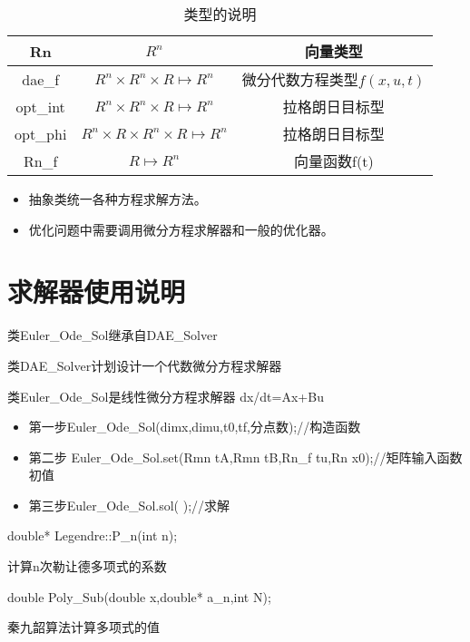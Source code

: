 \documentclass[a4]{ctexart}
\begin{document}
\begin{table}[h]
\centering  %
\caption{类型的说明}  %
\label{table1}  %
\begin{tabular}{|c|c|c|} 
\hline
Rn     &    $R^n$     &           向量类型  \\
\hline
dae\_f &   $R^n\times R^n\times R \mapsto R^n$ & 微分代数方程类型$f(x,u,t)$\\
 \hline
  opt\_int & $R^n\times R^n\times R\mapsto R^n$  & 拉格朗日目标型\\
 \hline
 opt\_phi   & $ R^n\times R\times R^n\times R\mapsto R^n$  & 拉格朗日目标型\\
 \hline
 Rn\_f   & $ R\mapsto R^n$  & 向量函数f(t)\\
 \hline
 
\end{tabular}
\end{table}



\begin{itemize}
\item 抽象类统一各种方程求解方法。
\item 优化问题中需要调用微分方程求解器和一般的优化器。
\end{itemize}







\section{求解器使用说明}
类Euler\_Ode\_Sol继承自DAE\_Solver

类DAE\_Solver计划设计一个代数微分方程求解器

类Euler\_Ode\_Sol是线性微分方程求解器
dx/dt=Ax+Bu

\begin{itemize}
\item 第一步Euler\_Ode\_Sol(dimx,dimu,t0,tf,分点数);//构造函数
\item 第二步 Euler\_Ode\_Sol.set(Rmn tA,Rmn tB,Rn\_f tu,Rn x0);//矩阵输入函数初值
\item 第三步Euler\_Ode\_Sol.sol( );//求解
\end{itemize}




double*  Legendre::P\_n(int n);

计算n次勒让德多项式的系数

double Poly\_Sub(double x,double* a\_n,int N);

秦九韶算法计算多项式的值
\end{document}
